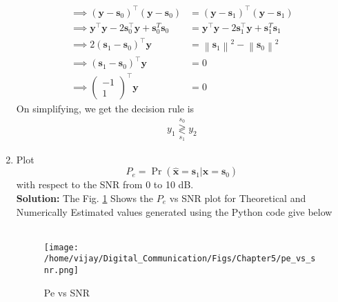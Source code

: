 \documentclass[journal,10pt,twocolumn]{IEEEtran}
\newcounter{Chapcounter}
\numberwithin{equation}{subsection}
\numberwithin{figure}{subsection}
\renewcommand\thesection{\theChapcounter.\arabic{section}}
\providecommand{\mbf}{\mathbf}
\providecommand{\pr}[1]{\ensuremath{\Pr\left(#1\right)}}
\providecommand{\brak}[1]{\ensuremath{\left(#1\right)}}
\providecommand{\norm}[1]{\left\lVert#1\right\rVert}
\newcommand{\solution}{\noindent \textbf{Solution: }}
\providecommand{\dec}[2]{\ensuremath{\overset{#1}{\underset{#2}{\gtrless}}}}
\newcommand{\myvec}[1]{\ensuremath{\begin{pmatrix}#1\end{pmatrix}}}
\let\vec\mathbf
\renewcommand\thesection{\arabic{section}}
\renewcommand\thesubsection{\thesection.\arabic{subsection}}
\begin{document}
\begin{enumerate}[label=\thesubsection.\arabic*,ref=\thesubsection.\arabic{figure}]
\begin{align}
	\implies \brak{\vec{y}-\vec{s}_0}^\top \brak{\vec{y}-\vec{s}_0} &= \brak{\vec{y}-\vec{s}_1}^\top \brak{\vec{y}-\vec{s}_1}\\
	\implies \vec{y}^\top\vec{y} - 2\vec{s}_0^\top \vec{y} + \vec{s}_0^T\vec{s}_0 &= \vec{y}^\top\vec{y} - 2\vec{s}_1^\top \vec{y} + \vec{s}_1^T\vec{s}_1\\
	\implies 2\brak{\vec{s}_1-\vec{s}_0}^\top \vec{y} &= \norm{\vec{s}_1}^2 - \norm{\vec{s}_0}^2\\
	\implies \brak{\vec{s}_1-\vec{s}_0}^\top \vec{y} &= 0\\
	\implies \myvec{-1\\1}^\top \vec{y} &= 0
\end{align}
        On simplifying, we get the decision rule is
        \begin{align}
        \label{eq:decision_rule}
        y_1 \dec{s_0}{s_1} y_2
        \end{align}
\item
Plot 
\begin{equation} 
P_e = \pr{\hat{\mbf{x}} = \mbf{s}_1|\mbf{x} = \mbf{s}_0}
\end{equation}
with respect to the SNR from 0 to 10 dB.\\
\solution 
The Fig. \ref{fig:Pe_snr2} Shows the $P_e$ vs SNR plot for Theoretical and Numerically Estimated values generated using the Python code give below\\

\\	

\begin{figure}[!ht]
\centering
\texttt{[image: /home/vijay/Digital\_Communication/Figs/Chapter5/pe\_vs\_snr.png]}     
\caption{Pe vs SNR }
\label{fig:Pe_snr2}
\end{figure}


\end{enumerate}
\end{document}
